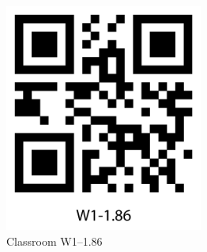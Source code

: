 \documentclass[11pt]{scrartcl}
\begin{document}
	\begin{figure}[htpb]
		\centering
		\includegraphics[height=7.5cm]{figure/qrcode_W1-186}
		\caption{Classroom W1--1.86\label{qrCodeW1-1.86}}
	\end{figure}
\end{document}
